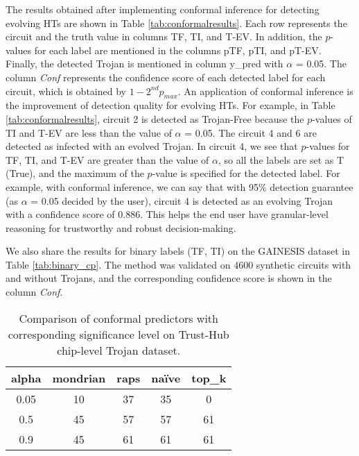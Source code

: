 \documentclass[9pt,conference]{IEEEtran}
\begin{document}
The results obtained after implementing conformal inference for detecting evolving HTs are shown in Table \ref{tab:conformalresults}. Each row represents the circuit and the truth value in columns TF, TI, and T-EV. In addition, the $p$-values for each label are mentioned in the columns pTF, pTI, and pT-EV. Finally, the detected Trojan is mentioned in column y\_pred with $\alpha$ = 0.05. The column \textit{Conf} represents the confidence score of each detected label for each circuit, which is obtained by $1 - 2^{nd}p_{max}$. An application of conformal inference is the improvement of detection quality for evolving HTs. For example, in Table \ref{tab:conformalresults}, circuit 2 is detected as Trojan-Free because the $p$-values of TI and T-EV are less than the value of $\alpha$ = 0.05. The circuit 4 and 6 are detected as infected with an evolved Trojan. In circuit 4, we see that $p$-values for TF, TI, and T-EV are greater than the value of $\alpha$, so all the labels are set as T (True), and the maximum of the $p$-value is specified for the detected label. For example, with conformal inference, we can say that with 95\% detection guarantee (as $\alpha$ = 0.05 decided by the user), circuit 4 is detected as an evolving Trojan with a confidence score of 0.886. This helps the end user have granular-level reasoning for trustworthy and robust decision-making.

We also share the results for binary labels (TF, TI) on the GAINESIS dataset in Table \ref{tab:binary_cp}. The method was validated on $4600$ synthetic circuits with and without Trojans, and the corresponding confidence score is shown in the column \textit{Conf}.

\begin{table}[t]
\centering
\caption{Comparison of conformal predictors with corresponding significance level on Trust-Hub chip-level Trojan dataset.}
\begin{tabular}{ccccc}
\hline
\textbf{alpha} & \textbf{mondrian} & \textbf{raps} & \textbf{naïve} & \textbf{top\_k} \\ \hline
0.05           & 10                & 37            & 35             & 0               \\ \hline
0.5            & 45                & 57            & 57             & 61              \\ \hline
0.9            & 45                & 61            & 61             & 61              \\ \hline
\end{tabular}
\label{tab:racp}
\end{table}
\end{document}

